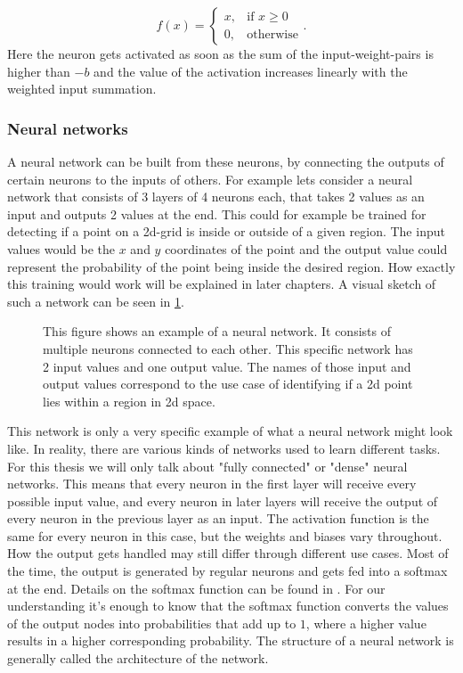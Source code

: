 \begin{equation}
	f(x) = 
	\begin{cases}
		x, &\text{if } x\geq0 \\
		0, &\text{otherwise}
	\end{cases}.
\end{equation}
Here the neuron gets activated as soon as the sum of the input-weight-pairs is higher than $-b$ and the value of the activation increases linearly with the weighted input summation.
\subsubsection{Neural networks}
A neural network can be built from these neurons, by connecting the outputs of certain neurons to the inputs of others. For example lets consider a neural network that consists of 3 layers of 4 neurons each, that takes 2 values as an input and outputs 2 values at the end. This could for example be trained for detecting if a point on a 2d-grid is inside or outside of a given region. The input values would be the $x$ and $y$ coordinates of the point and the output value could represent the probability of the point being inside the desired region. How exactly this training would work will be explained in later chapters. A visual sketch of such a network can be seen in \cref{fig:Neural_network_example}. \\
\begin{figure}
	\centering
	
	\caption{This figure shows an example of a neural network. It consists of multiple neurons connected to each other. This specific network has 2 input values and one output value. The names of those input and output values correspond to the use case of identifying if a 2d point lies within a region in 2d space.}
	\label{fig:Neural_network_example}
\end{figure}
This network is only a very specific example of what a neural network might look like. In reality, there are various kinds of networks used to learn different tasks. For this thesis we will only talk about "fully connected" or "dense" neural networks. This means that every neuron in the first layer will receive every possible input value, and every neuron in later layers will receive the output of every neuron in the previous layer as an input. The activation function is the same for every neuron in this case, but the weights and biases vary throughout. How the output gets handled may still differ through different use cases. Most of the time, the output is generated by regular neurons and gets fed into a softmax at the end. Details on the softmax function can be found in \cite{gao2018properties}. For our understanding it's enough to know that the softmax function converts the values of the output nodes into probabilities that add up to $1$, where a higher value results in a higher corresponding probability. The structure of a neural network is generally called the architecture of the network. 

